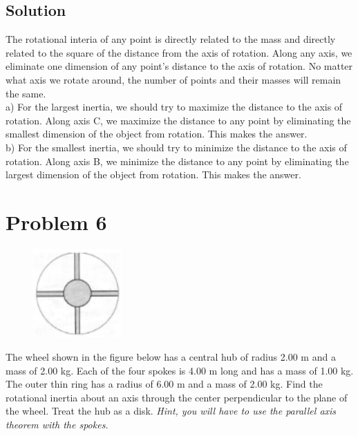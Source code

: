 \documentclass[12pt]{article}
\begin{document}
\subsection*{Solution}
The rotational interia of any point is directly related to the mass and directly related to the square of the distance from the axis of rotation. Along any axis, we eliminate one dimension of any point's distance to the axis of rotation. No matter what axis we rotate around, the number of points and their masses will remain the same.\\
a) For the largest inertia, we should try to maximize the distance to the axis of rotation. Along axis C, we maximize the distance to any point by eliminating the smallest dimension of the object from rotation. This makes  the answer.\\
b) For the smallest inertia, we should try to minimize the distance to the axis of rotation. Along axis B, we minimize the distance to any point by eliminating the largest dimension of the object from rotation. This makes  the answer.



\pagebreak
\section*{Problem 6}
\begin{figure}
    \vspace{-30pt}
    \includegraphics[width=0.30\textwidth]{graph_6.png} 
\end{figure}
The wheel shown in the figure below has a central hub of radius 2.00 m and a mass of 2.00
kg. Each of the four spokes is 4.00 m long and has a mass of 1.00 kg. The outer thin ring has a
radius of 6.00 m and a mass of 2.00 kg. Find the rotational inertia about an axis through the
center perpendicular to the plane of the wheel. Treat the hub as a disk. \textit{Hint, you will have to
use the parallel axis theorem with the spokes.}
\end{document}
